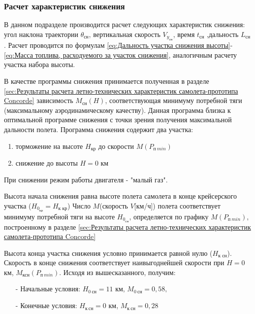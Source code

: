 \subsubsection{Расчет характеристик снижения}

В данном подразделе производится расчет следующих характеристик
снижения: угол наклона траектории $\theta_\text{сн}$, вертикальная скорость $V_{y_\text{сн}}$, время $t_\text{сн}$ ,дальность $L_\text{сн}$. Расчет проводится по формулам \ref{eq:Дальность участка снижения высоты}-\ref{eq:Масса топлива, расходуемого за участок снижения}, аналогичным расчету участка набора высоты. 

В качестве программы снижения принимается полученная в разделе \ref{sec:Результаты расчета летно-технических характеристик самолета-прототипа Concorde} зависимость $M_\text{сн}(H)$, соответствующая минимуму потребной тяги (максимальному аэродинамическому качеству). Данная программа близка к оптимальной программе снижения с точки зрения получения максимальной дальности полета. 
Программа снижения содержит два участка:
\begin{enumerate}
    \item торможение на высоте $H_\text{кр}$ до скорости $M(P_{\text{п} \ min})$
    \item снижение до высоты $H = 0$ км
\end{enumerate} 

При снижении режим работы двигателя - "малый газ". 

Высота начала снижения равна высоте полета самолета в конце крейсерского участка ($H_{0_\text{кр}} = H_\text{к \ кр}$) Число $M$(скорость $V$[км/ч]) полета соответствует минимуму потребной тяги на высоте $H_{0_\text{сн}}$, определяется по графику $M(P_{\text{п} \ min})$, построенному в разделе \ref{sec:Результаты расчета летно-технических характеристик самолета-прототипа Concorde}

Высота конца участка снижения условно принимается равной нулю ($H_\text{к \ сн}$). Скорость в конце снижения соответствует наивыгоднейшей скорости при $H = 0$ км, $M_\text{ксн}(P_{\text{п} \ min})$.  Исходя из вышесказанного, получим:
\begin{itemize}
    \item [-] Начальные условия: $H_{0 \ \text{сн}} = 11$ км, $M_{0 \ \text{сн}} = 0,58,$
    \item [-] Конечные условия: $H_{\text{к} \ \text{сн}} = 0$ км, $M_{\text{к} \ \text{сн}} = 0,28$
\end{itemize}

